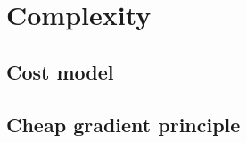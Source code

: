 \section{Complexity}
\label{sec:complexity}

\subsection{Cost model}

\subsection{Cheap gradient principle}